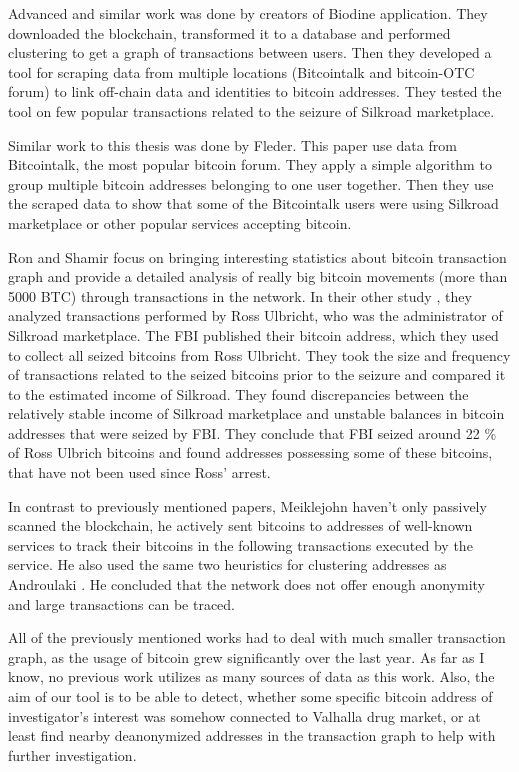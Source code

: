 \documentclass[
  digital, %
  table,   %
  lof,     %
  lot,     %
  oneside
]{fithesis3}
\begin{document}
Advanced and similar work \cite{spagnuolo2014bitiodine} was done by creators of Biodine application. They downloaded the blockchain, transformed it to
 a database and performed clustering to get a graph of transactions between users.
Then they developed a tool for scraping data from multiple locations (Bitcointalk and bitcoin-OTC forum) to link
off-chain data and identities to bitcoin addresses.
They tested the tool on few popular transactions related to the seizure of Silkroad marketplace.

Similar work \cite{fleder2015bitcoin} to this thesis was done by Fleder.
This paper use data from Bitcointalk, the most popular bitcoin forum. 
They apply a simple algorithm to group multiple bitcoin addresses belonging to one user together.
Then they use the scraped data to show
that some of the Bitcointalk users were using Silkroad marketplace or other popular services accepting bitcoin.
 
Ron and Shamir \cite{ron2013quantitative} focus on bringing
interesting statistics about bitcoin transaction graph
and provide a detailed analysis of really big bitcoin movements (more than 5000 BTC) 
through transactions in the network.
In their other study \cite{ron2014did}, they analyzed transactions performed by Ross Ulbricht,
who was the administrator of Silkroad marketplace.
The FBI published their bitcoin address, which they used to collect all seized bitcoins from Ross Ulbricht.
They took the size and frequency of transactions related to the seized bitcoins prior to the seizure and compared it to the estimated income of Silkroad. They found discrepancies between the relatively stable income of Silkroad marketplace and unstable balances in bitcoin addresses
that were seized by FBI. They conclude that FBI seized around 22 \% of Ross Ulbrich bitcoins
and found addresses possessing some of these bitcoins, that have not been used since Ross' arrest.

In contrast to previously mentioned papers, Meiklejohn \cite{meiklejohn2013fistful} 
haven't only passively scanned the blockchain, he actively sent bitcoins to addresses of
well-known services to track their bitcoins in the following transactions executed by the service.
He also used the same two heuristics for clustering addresses
as Androulaki \cite{androulaki2013evaluating}.
He concluded that the network does not offer enough anonymity and large transactions can be traced.

All of the previously mentioned works had to deal with much smaller transaction graph,
as the usage of bitcoin grew significantly over the last year. 
As far as I know,
no previous work utilizes as many sources of data as this work.
Also, the aim of our tool is to be able to detect, whether some specific bitcoin address of 
investigator's interest was somehow connected to Valhalla drug market, or at least find nearby
deanonymized addresses in the transaction graph to help with further investigation.
\end{document}
